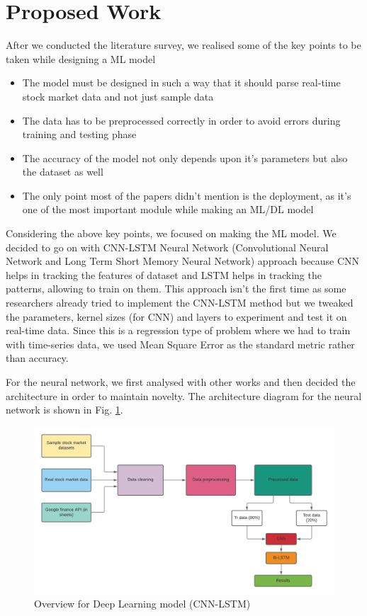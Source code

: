 \documentclass[conference]{IEEEtran}
\begin{document}
\section{Proposed Work}
After we conducted the literature survey, we realised some of the key points to be taken while designing a ML model
\begin{itemize}
\item The model must be designed in such a way that it should parse real-time stock market data and not just sample data
\item The data has to be preprocessed correctly in order to avoid errors during training and testing phase
\item The accuracy of the model not only depends upon it's parameters but also the dataset as well
\item The only point most of the papers didn't mention is the deployment, as it's one of the most important module while making an ML/DL model
\end{itemize}
Considering the above key points, we focused on making the ML model. We decided to go on with CNN-LSTM Neural Network (Convolutional Neural Network and Long Term Short Memory Neural Network) approach because CNN helps in tracking the features of dataset and LSTM helps in tracking the patterns, allowing to train on them. This approach isn't the first time as some researchers already tried to implement the CNN-LSTM method but we tweaked the parameters, kernel sizes (for CNN) and layers to experiment and test it on real-time data. Since this is a regression type of problem where we had to train with time-series data, we used Mean Square Error as the standard metric rather than accuracy.

For the neural network, we first analysed with other works and then decided the architecture in order to maintain novelty. The architecture diagram for the neural network is shown in Fig. \ref{model-sam}.

\begin{figure}[htbp]
\centerline{\includegraphics[scale=0.3]{SI - Arch.png}}
\caption{Overview for Deep Learning model (CNN-LSTM)}
\label{model-sam}
\end{figure}
\end{document}
